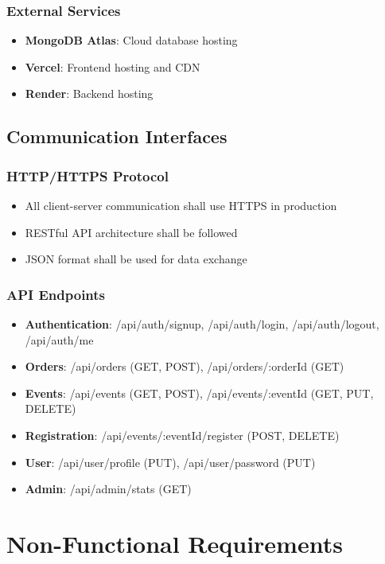 \documentclass{scrreprt}
\begin{document}
\subsection{External Services}
\begin{itemize}
\item \textbf{MongoDB Atlas}: Cloud database hosting
\item \textbf{Vercel}: Frontend hosting and CDN
\item \textbf{Render}: Backend hosting
\end{itemize}

\section{Communication Interfaces}

\subsection{HTTP/HTTPS Protocol}
\begin{itemize}
\item All client-server communication shall use HTTPS in production
\item RESTful API architecture shall be followed
\item JSON format shall be used for data exchange
\end{itemize}

\subsection{API Endpoints}
\begin{itemize}
\item \textbf{Authentication}: /api/auth/signup, /api/auth/login, /api/auth/logout, /api/auth/me
\item \textbf{Orders}: /api/orders (GET, POST), /api/orders/:orderId (GET)
\item \textbf{Events}: /api/events (GET, POST), /api/events/:eventId (GET, PUT, DELETE)
\item \textbf{Registration}: /api/events/:eventId/register (POST, DELETE)
\item \textbf{User}: /api/user/profile (PUT), /api/user/password (PUT)
\item \textbf{Admin}: /api/admin/stats (GET)
\end{itemize}


\chapter{Non-Functional Requirements}
\end{document}
